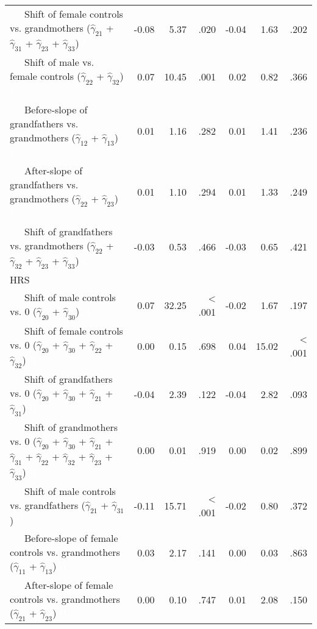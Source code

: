 \documentclass[
  english,
  man, noextraspace]{apa7}
\newenvironment{lltable}{\begin{landscape}\begin{center}\begin{ThreePartTable}}{\end{ThreePartTable}\end{center}\end{landscape}}
\begin{document}
\begin{appendix}
\begin{lltable}
{\begin{longtable}{lrrrrrr}
\ \ \ Shift of female controls vs. grandmothers 
($\hat{\gamma}_{21}$ + $\hat{\gamma}_{31}$ + 
$\hat{\gamma}_{23}$ + $\hat{\gamma}_{33}$) \textcolor{white}{L} & -0.08 & 5.37 & .020 & -0.04 & 1.63 & .202\\
\ \ \ Shift of male vs. female controls 
($\hat{\gamma}_{22}$ + $\hat{\gamma}_{32}$) \textcolor{white}{L} & 0.07 & 10.45 & .001 & 0.02 & 0.82 & .366\\
\ \ \ Before-slope of grandfathers vs. grandmothers 
($\hat{\gamma}_{12}$ + $\hat{\gamma}_{13}$) \textcolor{white}{L} & 0.01 & 1.16 & .282 & 0.01 & 1.41 & .236\\
\ \ \ After-slope of grandfathers vs. grandmothers 
($\hat{\gamma}_{22}$ + $\hat{\gamma}_{23}$) \textcolor{white}{L} & 0.01 & 1.10 & .294 & 0.01 & 1.33 & .249\\
\ \ \ Shift of grandfathers vs. grandmothers 
($\hat{\gamma}_{22}$ + $\hat{\gamma}_{32}$ + 
$\hat{\gamma}_{23}$ + $\hat{\gamma}_{33}$) \textcolor{white}{L} & -0.03 & 0.53 & .466 & -0.03 & 0.65 & .421\\
HRS &  &  &  &  &  & \\
\ \ \ Shift of male controls vs. 0 ($\hat{\gamma}_{20}$ + 
$\hat{\gamma}_{30}$) \textcolor{white}{H} & 0.07 & 32.25 & < .001 & -0.02 & 1.67 & .197\\
\ \ \ Shift of female controls vs. 0 ($\hat{\gamma}_{20}$ + 
$\hat{\gamma}_{30}$ + $\hat{\gamma}_{22}$ + 
$\hat{\gamma}_{32}$) \textcolor{white}{H} & 0.00 & 0.15 & .698 & 0.04 & 15.02 & < .001\\
\ \ \ Shift of grandfathers vs. 0 ($\hat{\gamma}_{20}$ + 
$\hat{\gamma}_{30}$ + $\hat{\gamma}_{21}$ + 
$\hat{\gamma}_{31}$) \textcolor{white}{H} & -0.04 & 2.39 & .122 & -0.04 & 2.82 & .093\\
\ \ \ Shift of grandmothers vs. 0 ($\hat{\gamma}_{20}$ + 
$\hat{\gamma}_{30}$ + $\hat{\gamma}_{21}$ + 
$\hat{\gamma}_{31}$ + $\hat{\gamma}_{22}$ + 
$\hat{\gamma}_{32}$ + $\hat{\gamma}_{23}$ +
$\hat{\gamma}_{33}$) \textcolor{white}{H} & 0.00 & 0.01 & .919 & 0.00 & 0.02 & .899\\
\ \ \ Shift of male controls vs. grandfathers 
($\hat{\gamma}_{21}$ + $\hat{\gamma}_{31}$) \textcolor{white}{H} & -0.11 & 15.71 & < .001 & -0.02 & 0.80 & .372\\
\ \ \ Before-slope of female controls vs. grandmothers 
($\hat{\gamma}_{11}$ + $\hat{\gamma}_{13}$) \textcolor{white}{H} & 0.03 & 2.17 & .141 & 0.00 & 0.03 & .863\\
\ \ \ After-slope of female controls vs. grandmothers 
($\hat{\gamma}_{21}$ + $\hat{\gamma}_{23}$) \textcolor{white}{H} & 0.00 & 0.10 & .747 & 0.01 & 2.08 & .150\\

\end{longtable}}
\end{lltable}
\end{appendix}
\end{document}
